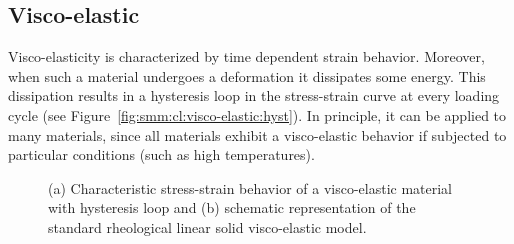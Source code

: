 \subsection{Visco-elastic}

Visco-elasticity is characterized by time dependent strain
behavior. Moreover, when such a material undergoes a deformation it
dissipates some energy. This dissipation results in a hysteresis loop
in the stress-strain curve at every loading cycle (see
Figure~\ref{fig:smm:cl:visco-elastic:hyst}). In principle, it can be
applied to many materials, since all materials exhibit a visco-elastic
behavior if subjected to particular conditions (such as high
temperatures).
\begin{figure}[!htb]
  \begin{center}

    \hspace{0.05\textwidth}
    \caption{(a) Characteristic stress-strain behavior of a visco-elastic material with hysteresis loop and (b) schematic representation of the standard rheological linear solid visco-elastic model.}
    \label{fig:smm:cl:visco-elastic}
  \end{center}
\end{figure}
